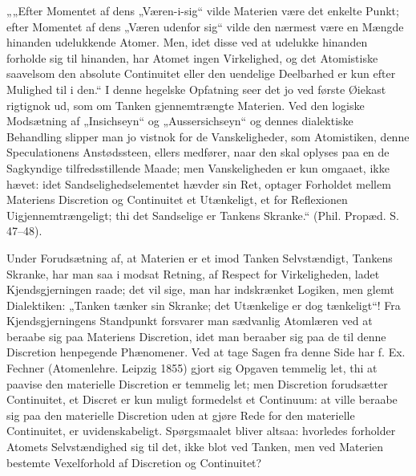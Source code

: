 \documentclass[12pt,a4paper]{book}
\begin{document}
„„Efter Momentet af dens „Væren-i-sig“ vilde Materien
være det enkelte Punkt; efter Momentet af dens „Væren
udenfor sig“ vilde den nærmest være en Mængde hinanden
udelukkende Atomer. Men, idet disse ved at udelukke
hinanden forholde sig til hinanden, har Atomet ingen
Virkelighed, og det Atomistiske saavelsom den absolute Continuitet
eller den uendelige Deelbarhed er kun efter Mulighed til i
den.“ I denne hegelske Opfatning seer det jo ved første
Øiekast rigtignok ud, som om Tanken gjennemtrængte
Materien. Ved den logiske Modsætning af „Insichseyn“ og
„Aussersichseyn“ og dennes dialektiske Behandling slipper man
jo vistnok for de Vanskeligheder, som Atomistiken, denne
Speculationens Anstødssteen, ellers medfører, naar den skal
oplyses paa en de Sagkyndige tilfredsstillende Maade; men
Vanskeligheden er kun omgaaet, ikke hævet: idet
Sandselighedselementet hævder sin Ret, optager Forholdet mellem Materiens
Discretion og Continuitet et Utænkeligt, et for Reflexionen
Uigjennemtrængeligt; thi det Sandselige er Tankens Skranke.“
(Phil. Propæd. S. 47--48).

Under Forudsætning af, at Materien er et imod Tanken
Selvstændigt, Tankens Skranke, har man saa i modsat
Retning, af Respect for Virkeligheden, ladet Kjendsgjerningen
raade; det vil sige, man har indskrænket Logiken, men glemt
Dialektiken: „Tanken tænker sin Skranke; det Utænkelige er
dog tænkeligt“! Fra Kjendsgjerningens Standpunkt forsvarer
man sædvanlig Atomlæren ved at beraabe sig paa Materiens
Discretion, idet man beraaber sig paa de til denne Discretion
henpegende Phænomener. Ved at tage Sagen fra denne
Side har f. Ex. Fechner (Atomenlehre. Leipzig 1855) gjort
sig Opgaven temmelig let, thi at paavise den materielle
Discretion er temmelig let; men Discretion forudsætter Continuitet,
et Discret er kun muligt formedelst et Continuum: at ville
beraabe sig paa den materielle Discretion uden at gjøre
Rede for den materielle Continuitet, er uvidenskabeligt.
Spørgsmaalet bliver altsaa: hvorledes forholder Atomets
Selvstændighed sig til det, ikke blot ved Tanken, men ved
Materien bestemte Vexelforhold af Discretion og Continuitet?
\end{document}

